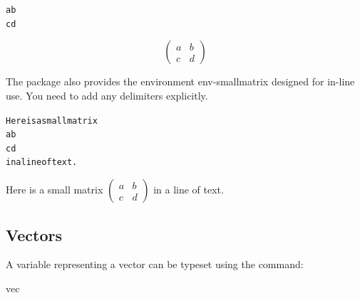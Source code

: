 \begin{code}
\begin{alltt}
  a  b
  c  d
\end{alltt}
\end{code}
\begin{result}
\begin{equation}
\begin{pmatrix}
a & b\\
c & d
\end{pmatrix}
\end{equation}
\end{result}

The  package also provides the environment
\gls{env-smallmatrix} designed for in-line use. You need to add any
delimiters explicitly.

\begin{code}
\begin{alltt}
Here is a small matrix
  a  b
  c  d
in a line of text.
\end{alltt}
\end{code}
\begin{resultS}
Here is a small matrix
\begin{math}
\left(
\begin{smallmatrix}
a & b\\
c & d
\end{smallmatrix}
\right)
\end{math}
in a line of text.
\end{resultS}



\subsection{Vectors}
\label{sec:vec}

A variable representing a vector can be typeset using the command:
\begin{definition}
\gls{vec}
\end{definition}\screenpagebreak

